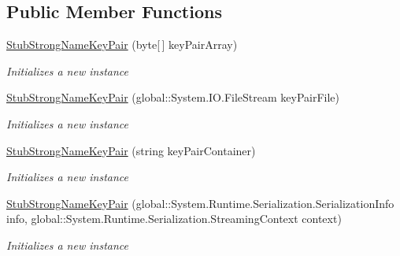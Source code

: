\subsection*{Public Member Functions}
\begin{DoxyCompactItemize}
\item 
\hyperlink{class_system_1_1_reflection_1_1_fakes_1_1_stub_strong_name_key_pair_a035d35c7c2fe3898a08d64bc9b78c13e}{Stub\-Strong\-Name\-Key\-Pair} (byte\mbox{[}$\,$\mbox{]} key\-Pair\-Array)
\begin{DoxyCompactList}\small\item\em Initializes a new instance\end{DoxyCompactList}\item 
\hyperlink{class_system_1_1_reflection_1_1_fakes_1_1_stub_strong_name_key_pair_abaea5e924b4049e942cdf7943770e3f9}{Stub\-Strong\-Name\-Key\-Pair} (global\-::\-System.\-I\-O.\-File\-Stream key\-Pair\-File)
\begin{DoxyCompactList}\small\item\em Initializes a new instance\end{DoxyCompactList}\item 
\hyperlink{class_system_1_1_reflection_1_1_fakes_1_1_stub_strong_name_key_pair_a2eed74990cffddc9e96fd449d607f39c}{Stub\-Strong\-Name\-Key\-Pair} (string key\-Pair\-Container)
\begin{DoxyCompactList}\small\item\em Initializes a new instance\end{DoxyCompactList}\item 
\hyperlink{class_system_1_1_reflection_1_1_fakes_1_1_stub_strong_name_key_pair_a516ac7a114707655c6375ebda3de391b}{Stub\-Strong\-Name\-Key\-Pair} (global\-::\-System.\-Runtime.\-Serialization.\-Serialization\-Info info, global\-::\-System.\-Runtime.\-Serialization.\-Streaming\-Context context)
\begin{DoxyCompactList}\small\item\em Initializes a new instance\end{DoxyCompactList}\end{DoxyCompactItemize}
